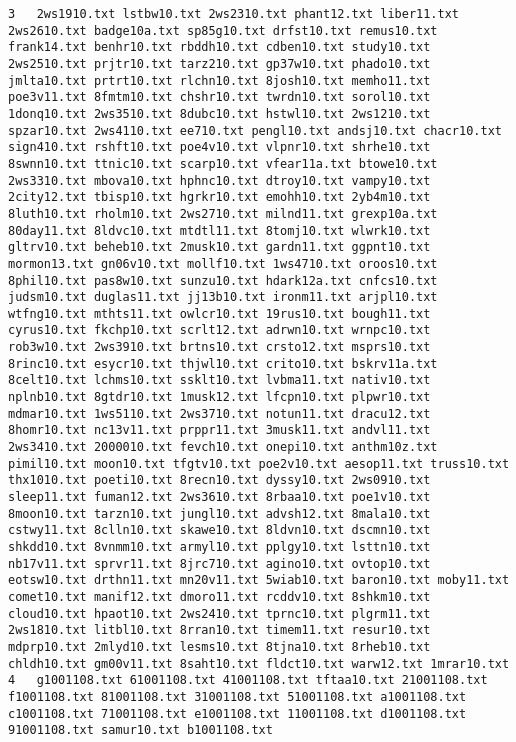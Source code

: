\documentclass{article}
\begin{document}
\begin{lstlisting}
3	2ws1910.txt lstbw10.txt 2ws2310.txt phant12.txt liber11.txt 2ws2610.txt badge10a.txt sp85g10.txt drfst10.txt remus10.txt frank14.txt benhr10.txt rbddh10.txt cdben10.txt study10.txt 2ws2510.txt prjtr10.txt tarz210.txt gp37w10.txt phado10.txt jmlta10.txt prtrt10.txt rlchn10.txt 8josh10.txt memho11.txt poe3v11.txt 8fmtm10.txt chshr10.txt twrdn10.txt sorol10.txt 1donq10.txt 2ws3510.txt 8dubc10.txt hstwl10.txt 2ws1210.txt spzar10.txt 2ws4110.txt ee710.txt pengl10.txt andsj10.txt chacr10.txt sign410.txt rshft10.txt poe4v10.txt vlpnr10.txt shrhe10.txt 8swnn10.txt ttnic10.txt scarp10.txt vfear11a.txt btowe10.txt 2ws3310.txt mbova10.txt hphnc10.txt dtroy10.txt vampy10.txt 2city12.txt tbisp10.txt hgrkr10.txt emohh10.txt 2yb4m10.txt 8luth10.txt rholm10.txt 2ws2710.txt milnd11.txt grexp10a.txt 80day11.txt 8ldvc10.txt mtdtl11.txt 8tomj10.txt wlwrk10.txt gltrv10.txt beheb10.txt 2musk10.txt gardn11.txt ggpnt10.txt mormon13.txt gn06v10.txt mollf10.txt 1ws4710.txt oroos10.txt 8phil10.txt pas8w10.txt sunzu10.txt hdark12a.txt cnfcs10.txt judsm10.txt duglas11.txt jj13b10.txt ironm11.txt arjpl10.txt wtfng10.txt mthts11.txt owlcr10.txt 19rus10.txt bough11.txt cyrus10.txt fkchp10.txt scrlt12.txt adrwn10.txt wrnpc10.txt rob3w10.txt 2ws3910.txt brtns10.txt crsto12.txt msprs10.txt 8rinc10.txt esycr10.txt thjwl10.txt crito10.txt bskrv11a.txt 8celt10.txt lchms10.txt ssklt10.txt lvbma11.txt nativ10.txt nplnb10.txt 8gtdr10.txt 1musk12.txt lfcpn10.txt plpwr10.txt mdmar10.txt 1ws5110.txt 2ws3710.txt notun11.txt dracu12.txt 8homr10.txt nc13v11.txt prppr11.txt 3musk11.txt andvl11.txt 2ws3410.txt 2000010.txt fevch10.txt onepi10.txt anthm10z.txt pimil10.txt moon10.txt tfgtv10.txt poe2v10.txt aesop11.txt truss10.txt thx1010.txt poeti10.txt 8recn10.txt dyssy10.txt 2ws0910.txt sleep11.txt fuman12.txt 2ws3610.txt 8rbaa10.txt poe1v10.txt 8moon10.txt tarzn10.txt jungl10.txt advsh12.txt 8mala10.txt cstwy11.txt 8clln10.txt skawe10.txt 8ldvn10.txt dscmn10.txt shkdd10.txt 8vnmm10.txt armyl10.txt pplgy10.txt lsttn10.txt nb17v11.txt sprvr11.txt 8jrc710.txt agino10.txt ovtop10.txt eotsw10.txt drthn11.txt mn20v11.txt 5wiab10.txt baron10.txt moby11.txt comet10.txt manif12.txt dmoro11.txt rcddv10.txt 8shkm10.txt cloud10.txt hpaot10.txt 2ws2410.txt tprnc10.txt plgrm11.txt 2ws1810.txt litbl10.txt 8rran10.txt timem11.txt resur10.txt mdprp10.txt 2mlyd10.txt lesms10.txt 8tjna10.txt 8rheb10.txt chldh10.txt gm00v11.txt 8saht10.txt fldct10.txt warw12.txt 1mrar10.txt
4	g1001108.txt 61001108.txt 41001108.txt tftaa10.txt 21001108.txt f1001108.txt 81001108.txt 31001108.txt 51001108.txt a1001108.txt c1001108.txt 71001108.txt e1001108.txt 11001108.txt d1001108.txt 91001108.txt samur10.txt b1001108.txt

\end{lstlisting}
\end{document}
